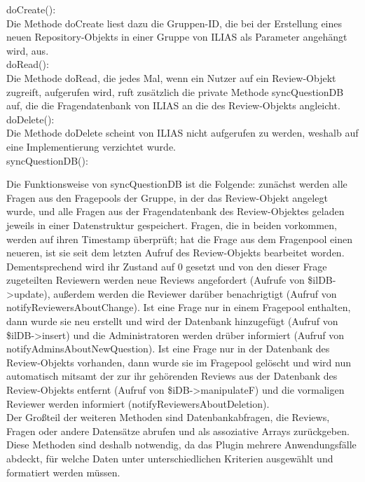 \documentclass[a4paper]{scrreprt}
\begin{document}
doCreate():\\
Die Methode doCreate liest dazu die Gruppen-ID, die bei der Erstellung eines neuen Repository-Objekts in einer Gruppe von ILIAS als Parameter angehängt wird, aus. \\

doRead():\\
Die Methode doRead, die jedes Mal, wenn ein Nutzer auf ein Review-Objekt zugreift, aufgerufen wird, ruft zusätzlich die private Methode syncQuestionDB auf, die die Fragendatenbank von ILIAS an die des Review-Objekts angleicht. \\

doDelete():\\
Die Methode doDelete scheint von ILIAS nicht aufgerufen zu werden, weshalb auf eine Implementierung verzichtet wurde.\\

syncQuestionDB():

Die Funktionsweise von syncQuestionDB ist die Folgende: zunächst werden alle Fragen aus den Fragepools der Gruppe, in der das Review-Objekt angelegt wurde, und alle Fragen aus der Fragendatenbank des Review-Objektes geladen jeweils in einer Datenstruktur gespeichert. 
Fragen, die in beiden vorkommen, werden auf ihren Timestamp überprüft; hat die Frage aus dem Fragenpool einen neueren, ist sie seit dem letzten Aufruf des Review-Objekts bearbeitet worden. 
Dementsprechend wird ihr Zustand auf 0 gesetzt und von den dieser Frage zugeteilten Reviewern werden neue Reviews angefordert (Aufrufe von \$ilDB->update), außerdem werden die Reviewer darüber benachrigtigt (Aufruf von notifyReviewersAboutChange). 
Ist eine Frage nur in einem Fragepool enthalten, dann wurde sie neu erstellt und wird der Datenbank hinzugefügt (Aufruf von \$ilDB->insert) und die Administratoren werden drüber informiert (Aufruf von notifyAdminsAboutNewQuestion). 
Ist eine Frage nur in der Datenbank des Review-Objekts vorhanden, dann wurde sie im Fragepool gelöscht und wird nun automatisch mitsamt der zur ihr gehörenden Reviews aus der Datenbank des Review-Objekts entfernt (Aufruf von \$iDB->manipulateF) und die vormaligen Reviewer werden informiert (notifyReviewersAboutDeletion).\\

Der Großteil der weiteren Methoden sind Datenbankabfragen, die Reviews, Fragen oder andere Datensätze abrufen und als assoziative Arrays zurückgeben. 
Diese Methoden sind deshalb notwendig, da das Plugin mehrere Anwendungsfälle abdeckt, für welche Daten unter unterschiedlichen Kriterien ausgewählt und formatiert werden müssen. \\
\end{document}
